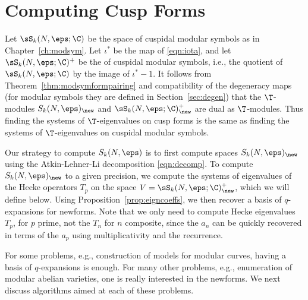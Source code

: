 \section{Computing Cusp Forms}\label{sec:compcuspforms}
Let $\sS_k(N,\eps;\C)$ be the space of cuspidal modular symbols as in
Chapter~\ref{ch:modsym}.  Let $\iota^*$ be the map of 
\eqref{eqn:iota}, and let $\sS_k(N,\eps;\C)^+$
 be the  of cuspidal modular symbols,
i.e., the quotient of $\sS_k(N,\eps;\C)$ by the image of $\iota^*-1$. 
It follows from
Theorem~\ref{thm:modsymformpairing} and compatibility of the
degeneracy maps (for modular symbols they are defined
in Section~\ref{sec:degen}) that the $\T$-modules $S_k(N,\eps)_{\new}$
and $\sS_k(N,\eps;\C)^+_{\new}$ are dual as $\T$-modules.
Thus finding the systems of $\T$-eigenvalues on cusp forms is the same
as finding the systems of $\T$-eigenvalues on cuspidal modular
symbols.

Our strategy to compute $S_k(N,\eps)$ is to first compute spaces
$S_k(N,\eps)_{\new}$ using the Atkin-Lehner-Li decomposition
\eqref{eqn:decomp}.  To compute $S_k(N,\eps)_{\new}$ to a given
precision, we compute the systems of eigenvalues of the Hecke
operators $T_p$ on the space $V=\sS_k(N,\eps;\C)^+_{\new}$, which we
will define below.  Using Proposition~\ref{prop:eigncoeffs}, we then
recover a basis of $q$-expansions for newforms.  Note that we only
need to compute Hecke eigenvalues $T_p$, for $p$ prime, not the $T_n$
for $n$ composite, since the $a_n$ can be quickly recovered in terms
of the $a_p$ using multiplicativity and the recurrence.

For some problems, e.g., construction of models for modular curves,
having a basis of $q$-expansions is enough.  For many other problems,
e.g., enumeration of modular abelian varieties, one is really
interested in the newforms.  We next discuss algorithms aimed at each
of these problems.


